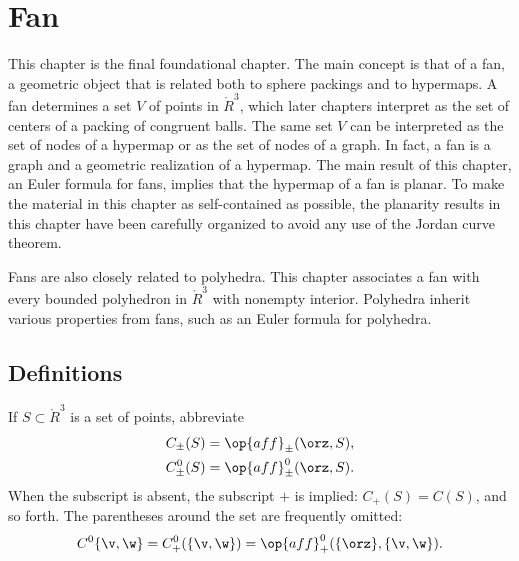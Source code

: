 \chapter{Fan}\label{sec:fan}




\begin{summary}
  This chapter is the final foundational chapter.  The main concept is
  that of a fan, a geometric object that is related both to sphere
  packings and to hypermaps.  A fan determines a set $V$ of points in
  $\ring{R}^3$, which later chapters interpret as the set of centers
  of a packing of congruent balls.  The same set $V$ can be
  interpreted as the set of nodes of a hypermap or as the set of
  nodes of a graph.  In fact, a fan is a graph and a geometric
  realization of a hypermap.  The main result of this chapter, an
  Euler formula for fans,  implies that the hypermap of a
  fan is planar.  To make the material in this chapter as self-contained
 as possible, the planarity results in this chapter have been carefully
  organized to avoid any use of the Jordan curve theorem.

  Fans are also closely related to polyhedra.  This chapter associates
  a fan with every bounded polyhedron in $\ring{R}^3$ with nonempty
  interior.  Polyhedra inherit various properties from fans, such
  as an Euler formula for polyhedra.
\end{summary}


%
%
%
%
%

\section{Definitions}






If $S\subset\ring{R}^3$ is a set of points,
abbreviate
\begin{align*}
C_\pm(S) &= \op{aff}_\pm(\orz,S),\\
C^0_\pm(S) &= \op{aff}^0_\pm(\orz,S).\\
\end{align*}
When the subscript is absent, the subscript $+$ is implied: $C_+(S)
= C(S)$, and so forth.  The parentheses around the set are frequently
omitted:
\[ C^0\{\v,\w\}=C^0_+(\{\v,\w\}) =
\op{aff}^0_+(\{\orz\},\{\v,\w\}).\] 
%
%

